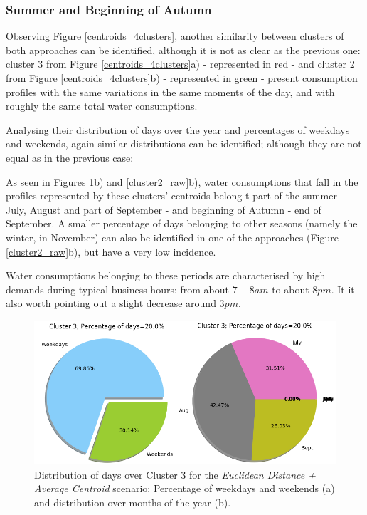 \documentclass[9pt,journal,compsoc]{IEEEtran}
\begin{document}
\subsubsection{Summer and Beginning of Autumn}

Observing Figure \ref{centroids_4clusters}, another similarity between clusters of both approaches can be identified, although it is not as clear as the previous one: cluster $3$ from Figure \ref{centroids_4clusters}a) - represented in red - and cluster $2$ from Figure \ref{centroids_4clusters}b) - represented in green - present consumption profiles with the same variations in the same moments of the day, and with roughly the same total water consumptions.

Analysing their distribution of days over the year and percentages of weekdays and weekends, again similar distributions can be identified; although they are not equal as in the previous case:

As seen in Figures \ref{cluster3_euclidean}b) and \ref{cluster2_raw}b), water consumptions that fall in the profiles represented by these clusters' centroids belong t part of the summer - July, August and part of September - and beginning of Autumn - end of September. A smaller percentage of days belonging to other seasons (namely the winter, in November) can also be identified in one of the approaches (Figure \ref{cluster2_raw}b), but have a very low incidence.

Water consumptions belonging to these periods are characterised by high demands during typical business hours: from about $7-8am$ to about $8pm$. It it also worth pointing out a slight decrease around $3pm$.

\begin{figure}
	\centering
	\includegraphics[scale=0.4]{images/percent_week__months_euc_average_cluster3_k4.png}
	\caption{Distribution of days over Cluster $3$ for the \emph{Euclidean Distance + Average Centroid} scenario: Percentage of weekdays and weekends (a) and distribution over months of the year (b).}
	\label{cluster3_euclidean}
\end{figure}
\end{document}
